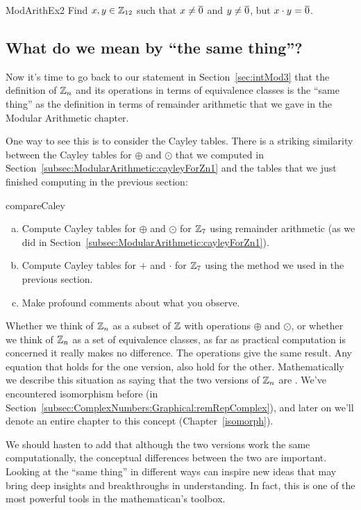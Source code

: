 \begin{exercise}{ModArithEx2}  
Find $x,y \in \mathbb{Z}_{12}$ such that $x \neq \overline{0}$ and $y \neq \overline{0}$, but $x \cdot y = \overline{0}$.
\end{exercise}

\subsection{What do we mean by ``the same thing''?}\label{sec:theSameThing}
Now it's time to go back to our statement in Section~\ref{sec:intMod3} that the definition of $\mathbb{Z}_n$ and its operations in terms of equivalence classes is the ``same thing'' as the definition in terms of remainder arithmetic that we gave in the Modular Arithmetic chapter.

One way to see this is to consider the Cayley tables. There is a striking similarity between the Cayley tables for $\oplus$ and $\odot$ that we computed in Section~\ref{subsec:ModularArithmetic:cayleyForZn1} and the tables that we just finished computing in the previous section:

\begin{exercise}{compareCaley}
\begin{enumerate}[(a)]
\item
Compute Cayley tables for $\oplus$ and $\odot$ for $\mathbb{Z}_7$ using remainder arithmetic (as we did in Section~\ref{subsec:ModularArithmetic:cayleyForZn1}).
\item
Compute Cayley tables for $+$ and $\cdot$ for $\mathbb{Z}_7$ using the method we used in the previous section.
\item
Make profound comments about what you observe.
\end{enumerate}
\end{exercise}

Whether we think of $\mathbb{Z}_n$ as a subset of $\mathbb{Z}$ with operations $\oplus$ and $\odot$, or whether we think of $\mathbb{Z}_n$ as a set of equivalence classes, as far as practical computation is concerned it really makes no difference. The operations give the same result. Any equation that holds for the one version, also hold for the other. Mathematically we describe this situation as saying that the two versions of $\mathbb{Z}_n$ are . We've encountered isomorphism before (in Section~\ref{subsec:ComplexNumbers:Graphical:remRepComplex}), and later on we'll denote an entire chapter to this concept (Chapter~\ref{isomorph}).

We should hasten to add that although the two versions work the same computationally, the conceptual differences between the two are important. Looking at the ``same thing'' in different ways can inspire new ideas that may bring deep insights and breakthroughs in understanding.  In fact, this is one of the most powerful tools in the mathematican's toolbox. 

